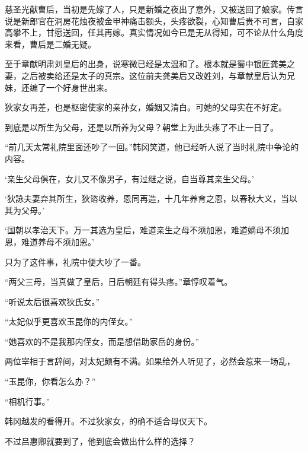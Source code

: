 慈圣光献曹后，当初是先嫁了人，只是新婚之夜出了意外，又被送回了娘家。传言说是新郎官在洞房花烛夜被金甲神痛击额头，头疼欲裂，心知曹后贵不可言，自家高攀不上，甘愿送回，任其再嫁。真实情况如今已是无从得知，可不论从什么角度来看，曹后是二婚无疑。

至于章献明肃刘皇后的出身，说寒微已经是太温和了。根本就是蜀中银匠龚美之妻，之后被卖给还是太子的真宗。这位前夫龚美后又改姓刘，与章献皇后认为兄妹，还编了一个好身世出来。

狄家女再差，也是枢密使家的亲孙女，婚姻又清白。可她的父母实在不好定。

到底是以所生为父母，还是以所养为父母？朝堂上为此头疼了不止一日了。

“前几天太常礼院里面还吵了一回。”韩冈笑道，他已经听人说了当时礼院中争论的内容。

‘亲生父母俱在，女儿又不像男子，有过继之说，自当尊其亲生父母。’

‘狄詠夫妻弃其所生，狄谘收养，恩同再造，十几年养育之恩，以春秋大义，当以其为父母。’

‘国朝以孝治天下。万一其选为皇后，难道亲生之母不须加恩，难道嫡母不须加恩，难道养母不须加恩。’

只为了这件事，礼院中便大吵了一番。

“两父三母，当真做了皇后，日后朝廷有得头疼。”章惇叹着气。

“听说太后很喜欢狄氏女。”

“太妃似乎更喜欢玉昆你的内侄女。”

“她喜欢的不是我那内侄女，而是想借助家岳的身份。”

两位宰相于言辞间，对太妃颇有不满。如果给外人听见了，必然会惹来一场乱，

“玉昆你，你看怎么办？”

“相机行事。”

韩冈越发的看得开。不过狄家女，的确不适合母仪天下。

不过吕惠卿就要到了，他到底会做出什么样的选择？
